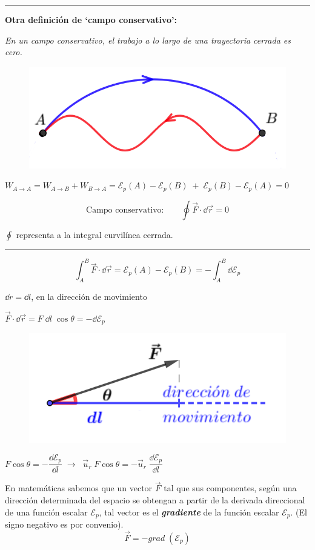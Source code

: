 \rule{150pt}{0.4pt} 

\textbf{Otra definición de `campo conservativo':} 

\begin{multicols}{2}
\emph{En un campo conservativo, el trabajo a lo largo de una trayectoria cerrada es cero.}
\begin{figure}[H]
		\centering
		\includegraphics[width=.3\textwidth]{imagenes/imagenes03/T03IM11.png}
		\end{figure}
\end{multicols}

$W_{A\to A}=W_{A\to B}+W_{B \to A}=\mathcal E_p(A)-\mathcal E_p(B) \;+ \; \mathcal E_p(B)-\mathcal E_p(A)=0$

$$ \text{Campo conservativo:}\qquad \oint \vec F \cdot \dd \vec r =0$$

\textcolor{gris}{$\oint$ representa a la integral curvilínea cerrada.}

\rule{150pt}{0.4pt} 

\begin{equation}
\int_A^B \vec F \cdot \dd \vec r = \mathcal E_p(A)- \mathcal E_p(B)=-\int_A^B\dd \mathcal E_p	
\end{equation}

\begin{multicols}{2}
$\dd r = \dd l$, en la dirección de movimiento

$\vec F\cdot \dd \vec r=F\; \dd l\; \cos \theta =-\dd \mathcal E_p $
\begin{figure}[H]
		\centering
		\includegraphics[width=.4\textwidth]{imagenes/imagenes03/T03IM12.png}
		\end{figure}
\end{multicols}

$F \cos \theta=- \dfrac{\dd \mathcal E_p}{\dd l} \; \to \;\; \vec u_r\;F \cos \theta=-\vec u_r\; \dfrac{\dd \mathcal E_p}{\dd l}$

En matemáticas sabemos que un vector $\vec F$ tal que sus componentes, según una dirección determinada del espacio se obtengan a partir de la derivada direccional de una función escalar $\mathcal E_p$, tal vector es el \textbf{\emph{gradiente}} de la función escalar $\mathcal E_p$. (El signo negativo es por convenio).
$$\vec F=-grad\;( \mathcal E_p)$$


